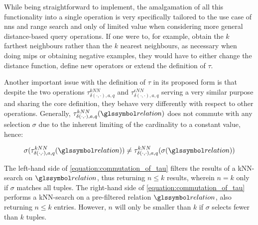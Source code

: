While being straightforward to implement, the amalgamation of all this functionality into a single operation is very specifically tailored to the use case of \acrshort{nns} and range search and only of limited value when considering more general distance-based query operations. If one were to, for example, obtain the $k$ farthest neighbours rather than the $k$ nearest neighbours, as necessary when doing \acrshort{mips} or obtaining negative examples, they would have to either change the distance function, define new operators or extend the definition of $\tau$. 

Another important issue with the definition of $\tau$ in its proposed form is that despite the two operations $\tau^{kNN}_{\delta(\cdot,\cdot),a,q}$ and $\tau^{\epsilon NN}_{\delta(\cdot,\cdot),a,q}$ serving a very similar purpose and sharing the core definition, they behave very differently with respect to other operations. Generally, $\tau^{kNN}_{\delta(\cdot,\cdot),a,q}(\relation)$ does not commute with any selection $\sigma$ due to the inherent limiting of the cardinality to a constant value, hence:

\begin{equation}
    \label{equation:commutation_of_tau}
    \sigma(\tau^{kNN}_{\delta(\cdot,\cdot),a,q}(\relation)) \neq \tau^{kNN}_{\delta(\cdot,\cdot),a,q}(\sigma(\relation))
\end{equation}

The left-hand side of \cref{equation:commutation_of_tau} filters the results of a kNN-search on $\relation$, thus returning $n \leq k$ results, wherein $n = k$ only if $\sigma$ matches all tuples. The right-hand side of \cref{equation:commutation_of_tau} performs a kNN-search on a pre-filtered relation $\relation$, also returning $n \leq k$ entries. However, $n$ will only be smaller than $k$ if $\sigma$ selects fewer than $k$ tuples.